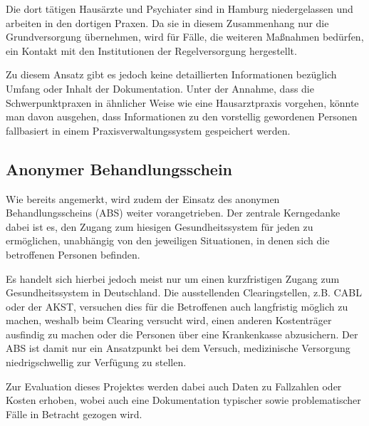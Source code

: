 Die dort tätigen Hausärzte und Psychiater sind in Hamburg niedergelassen und arbeiten in den dortigen Praxen. Da sie in diesem Zusammenhang nur die Grundversorgung übernehmen, wird für Fälle, die weiteren Maßnahmen bedürfen, ein Kontakt mit den Institutionen der Regelversorgung hergestellt.

Zu diesem Ansatz gibt es jedoch keine detaillierten Informationen bezüglich Umfang oder Inhalt der Dokumentation. Unter der Annahme, dass die Schwerpunktpraxen in ähnlicher Weise wie eine Hausarztpraxis vorgehen, könnte man davon ausgehen, dass Informationen zu den vorstellig gewordenen Personen fallbasiert in einem Praxisverwaltungssystem gespeichert werden. \citep{Leeden.2023}

\subsection{Anonymer Behandlungsschein}

Wie bereits angemerkt, wird zudem der Einsatz des anonymen Behandlungsscheins (\acs{ABS}) weiter vorangetrieben. Der zentrale Kerngedanke dabei ist es, den Zugang zum hiesigen Gesundheitssystem für jeden zu ermöglichen, unabhängig von den jeweiligen Situationen, in denen sich die betroffenen Personen befinden. 

Es handelt sich hierbei jedoch meist nur um einen kurzfristigen Zugang zum Gesundheitssystem in Deutschland. Die ausstellenden Clearingstellen, z.B. \ac{CABL} oder der \ac{AKST}, versuchen dies für die Betroffenen auch langfristig möglich zu machen, weshalb beim Clearing versucht wird, einen anderen Kostenträger ausfindig zu machen oder die Personen über eine Krankenkasse abzusichern. Der \acs{ABS} ist damit nur ein Ansatzpunkt bei dem Versuch, medizinische Versorgung niedrigschwellig zur Verfügung zu stellen.

Zur Evaluation dieses Projektes werden dabei auch Daten zu Fallzahlen oder Kosten erhoben, wobei auch eine Dokumentation typischer sowie problematischer Fälle in Betracht gezogen wird. \citep{Zanders.2022}